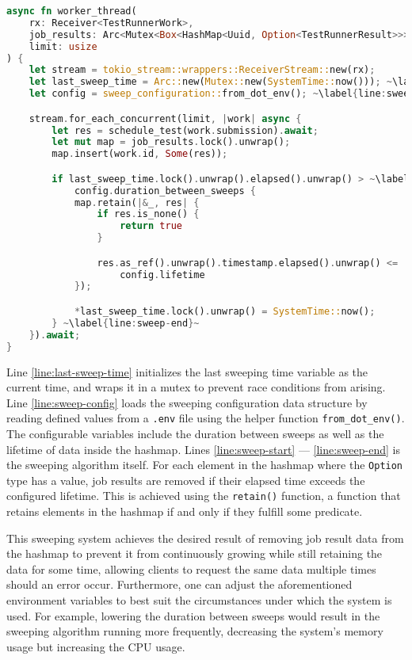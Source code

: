 \begin{lstlisting}[language=rust, escapechar=~, caption={The function introduced in section \ref{sec:queue-system} updated with sweeping}, label={lst:sweeping}]
async fn worker_thread(
    rx: Receiver<TestRunnerWork>,
    job_results: Arc<Mutex<Box<HashMap<Uuid, Option<TestRunnerResult>>>>>,
    limit: usize
) {
    let stream = tokio_stream::wrappers::ReceiverStream::new(rx);
    let last_sweep_time = Arc::new(Mutex::new(SystemTime::now())); ~\label{line:last-sweep-time}~
    let config = sweep_configuration::from_dot_env(); ~\label{line:sweep-config}~

    stream.for_each_concurrent(limit, |work| async {
        let res = schedule_test(work.submission).await;
        let mut map = job_results.lock().unwrap();
        map.insert(work.id, Some(res));

        if last_sweep_time.lock().unwrap().elapsed().unwrap() > ~\label{line:sweep-start}~
            config.duration_between_sweeps {
            map.retain(|&_, res| {
                if res.is_none() {
                    return true
                }

                res.as_ref().unwrap().timestamp.elapsed().unwrap() <=
                    config.lifetime
            });

            *last_sweep_time.lock().unwrap() = SystemTime::now();
        } ~\label{line:sweep-end}~
    }).await;
}
\end{lstlisting}

Line \ref{line:last-sweep-time} initializes the last sweeping time variable as the current time, and wraps it in a mutex to prevent race conditions from arising.
Line \ref{line:sweep-config} loads the sweeping configuration data structure by reading defined values from a \texttt{.env} file using the helper function \texttt{from\_dot\_env()}.
The configurable variables include the duration between sweeps as well as the lifetime of data inside the hashmap.
Lines \ref{line:sweep-start} --- \ref{line:sweep-end} is the sweeping algorithm itself.
For each element in the hashmap where the \texttt{Option} type has a value, job results are removed if their elapsed time exceeds the configured lifetime.
This is achieved using the \texttt{retain()} function, a function that retains elements in the hashmap if and only if they fulfill some predicate.

This sweeping system achieves the desired result of removing job result data from the hashmap to prevent it from continuously growing while still retaining the data for some time, allowing clients to request the same data multiple times should an error occur.
Furthermore, one can adjust the aforementioned environment variables to best suit the circumstances under which the system is used.
For example, lowering the duration between sweeps would result in the sweeping algorithm running more frequently, decreasing the system's memory usage but increasing the CPU usage.